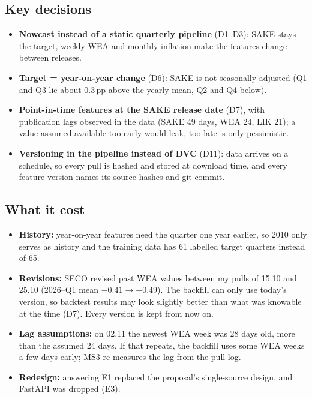 \documentclass[11pt,a4paper]{article}
\begin{document}
	\subsection{Key decisions}
	\begin{itemize}
		\item \textbf{Nowcast instead of a static quarterly pipeline} (D1--D3): SAKE stays the target, weekly WEA and
		monthly inflation make the features change between releases.
		\item \textbf{Target = year-on-year change} (D6): SAKE is not seasonally adjusted (Q1 and Q3 lie about 0.3\,pp
		above the yearly mean, Q2 and Q4 below).
		\item \textbf{Point-in-time features at the SAKE release date} (D7), with publication lags observed in the data
		(SAKE 49 days, WEA 24, LIK 21); a value assumed available too early would leak, too late is only pessimistic.
		\item \textbf{Versioning in the pipeline instead of DVC} (D11): data arrives on a schedule, so every pull is hashed
		and stored at download time, and every feature version names its source hashes and git commit.
	\end{itemize}
	\subsection{What it cost}
	\begin{itemize}
		\item \textbf{History:} year-on-year features need the quarter one year earlier, so 2010 only serves as history
		and the training data has 61 labelled target quarters instead of 65.
		\item \textbf{Revisions:} SECO revised past WEA values between my pulls of 15.10 and 25.10 (2026--Q1 mean
		$-0.41 \rightarrow -0.49$). The backfill can only use today's version, so backtest results may look slightly
		better than what was knowable at the time (D7). Every version is kept from now on.
		\item \textbf{Lag assumptions:} on 02.11 the newest WEA week was 28 days old, more than the assumed 24 days. If
		that repeats, the backfill uses some WEA weeks a few days early; MS3 re-measures the lag from the pull log.
		\item \textbf{Redesign:} answering E1 replaced the proposal's single-source design, and FastAPI was dropped (E3).
	\end{itemize}
	
\end{document}
